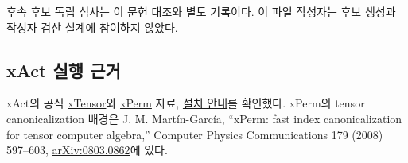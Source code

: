 후속 후보 독립 심사는 이 문헌 대조와 별도 기록이다. 이 파일 작성자는 후보 생성과 작성자 검산 설계에 참여하지 않았다.

\endgroup

\hypertarget{xact-uxc2e4uxd589-uxadfcuxac70}{%
\subsection{xAct 실행 근거}\label{xact-uxc2e4uxd589-uxadfcuxac70}}

xAct의 공식 \href{https://www.xact.es/xTensor/}{xTensor}와 \href{https://www.xact.es/xPerm/}{xPerm} 자료, \href{https://www.xact.es/download/install}{설치 안내}를 확인했다. xPerm의 tensor canonicalization 배경은 J. M. Martín-García, ``xPerm: fast index canonicalization for tensor computer algebra,'' Computer Physics Communications 179 (2008) 597--603, \href{https://arxiv.org/abs/0803.0862}{arXiv:0803.0862}에 있다.
